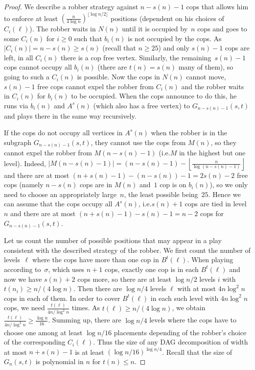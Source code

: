 \documentclass[authoryear]{article}
\makeatletter
\theoremstyle{definition}
\newcommand{\0}{\emptyset}
\newcommand{\ie}{i.e.\@\xspace}
\makeatother
\begin{document}
\begin{proof}
  We describe a robber strategy against $n-s(n)-1$ cops that allows
  him to enforce at least $(\frac{n}{4\log n})^{\lfloor\log
    n/2\rfloor}$ positions (dependent on his choices of
  $C_i(\ell)$). The robber waits in $N(n)$ until it is occupied
  by~$n$ cops and goes to some $C_i(n)$ for $i\ge 0$ such that $b_i(n)$
  is not occupied by the cops. As $|C_i(n)| = n-s(n) \ge s(n)$ (recall that
  $n\ge 25$) and only $s(n)-1$ cops are left, in all
  $C_i(n)$ there is a cop free vertex. Similarly, the remaining~$s(n)-1$
  cops cannot occupy all $b_i(n)$ (there are $t(n) = s(n)$ many of them), so going to such a $C_i(n)$ is
  possible. Now the cops in $N(n)$ cannot move, $s(n)-1$ free cops
  cannot expel the robber from $C_i(n)$ and the robber waits in
  $C_i(n)$ for $b_i(n)$ to be occupied. When the cops announce to do
  this, he runs via $b_i(n)$ and $A^s(n)$ (which also has a free
  vertex) to $G_{n-s(n)-1}(s,t)$ and plays there in the same
  way recursively.

  If the cops do not occupy all vertices in $A^s(n)$ when the robber
  is in the subgraph $G_{n-s(n)-1}(s,t)$, they cannot use the cops
  from $M(n)$, so they cannot expel the robber from $M(n-s(n)-1)$
  (\ie $M$ in the highest but one level). Indeed, $|M(n-s(n)-1)| =
  (n-s(n)-1) - \left\lfloor \frac{n}{\log(n-s(n)-1)} \right\rfloor$
  and there are at most $(n+s(n)-1) - (n-s(n)) - 1 = 2s(n)-2$ free
  cops (namely $n-s(n)$ cops are in $M(n)$ and~$1$ cop is on
  $b_i(n)$), so we only need to choose an appropriately large~$n$, the
  least possible being~$25$. Hence we can assume that the
  cops occupy all $A^s(n)$, \ie $s(n)+1$ cops are tied in level~$n$ and
  there are at most $(n+s(n)-1) - s(n) - 1 = n-2$ cops for
  $G_{n-s(n)-1}(s,t)$.

  Let us count the number of possible positions that may appear in a
  play consistent with the described strategy of the robber. We first
  count the number of levels~$\ell$ where the cops have more than one
  cop in $B^t(\ell)$. When playing according to~$\sigma$, which uses
  $n+1$ cops, exactly one cop is in each $B^t(\ell)$ and now we have
  $s(n)+2$ cops more, so there are at least $\log n/2$ levels $i$ with
  $t(n_i)\ge n/(4\log n)$. Then there are $\log n/4$ levels $\ell$ with at
  most $4n\log^2 n$ cops in each of them. In order to cover
  $B^t(\ell)$ in each such level with $4n\log^2 n$ cops, we need
  $\frac{t(\ell)}{4n/\log^2 n}$ times. As $t(\ell)\ge n/(4\log n)$, we
  obtain $\frac{t(\ell)}{4n/\log^2 n} \ge \frac{\log n}{16}$. Summing
  up, there are $\log n / 4$ levels where the cops have to choose one
  among at least $\log n/16$ placements depending of the robber's
  choice of the corresponding $C_i(\ell)$. Thus the size of any DAG
  decomposition of width at most $n+s(n)-1$ is at least $(\log n/16
  )^{\log n/4}$. Recall that the size of $G_n(s,t)$ is polynomial in
  $n$ for $t(n)\le n$.


\end{proof}
\end{document}
